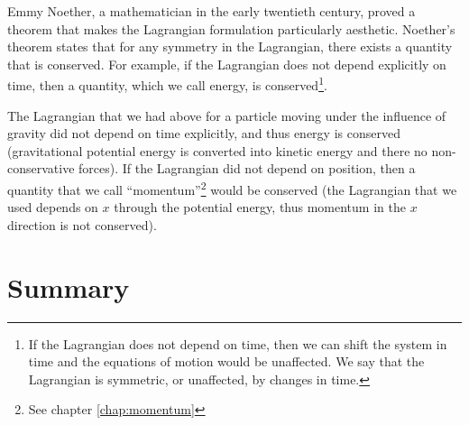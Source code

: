 Emmy Noether, a mathematician in the early twentieth century, proved a theorem that makes the Lagrangian formulation particularly aesthetic. Noether's theorem states that for any symmetry in the Lagrangian, there exists a quantity that is conserved. For example, if the Lagrangian does not depend explicitly on time, then a quantity, which we call energy, is conserved\footnote{If the Lagrangian does not depend on time, then we can shift the system in time and the equations of motion would be unaffected. We say that the Lagrangian is symmetric, or unaffected, by changes in time.}. 

The Lagrangian that we had above for a particle moving under the influence of gravity did not depend on time explicitly, and thus energy is conserved (gravitational potential energy is converted into kinetic energy and there no non-conservative forces). If the Lagrangian did not depend on position, then a quantity that we call ``momentum''\footnote{See chapter \ref{chap:momentum}} would be conserved (the Lagrangian that we used depends on $x$ through the potential energy, thus momentum in the $x$ direction is not conserved). 


\newpage
\section{Summary}

